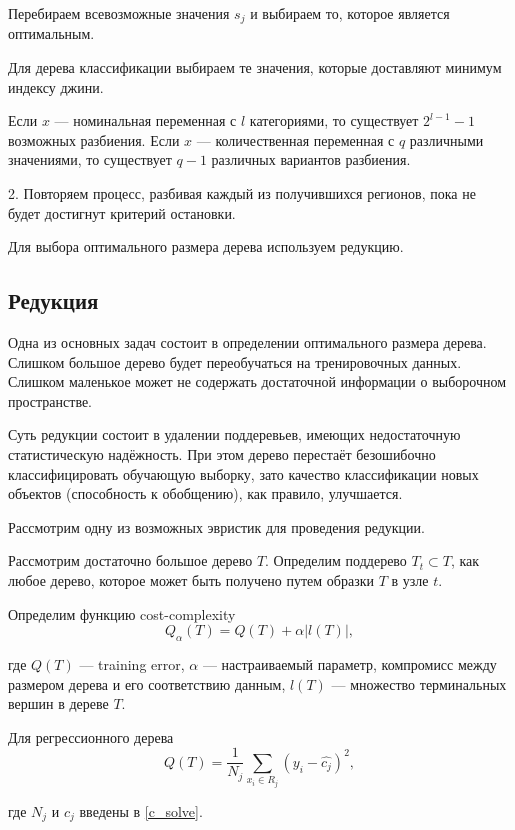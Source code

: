 \documentclass[14pt, a4paper]{article}
\begin{document}
Перебираем всевозможные значения $s_j$ и выбираем то, которое является оптимальным.

Для дерева классификации выбираем те значения, которые доставляют минимум индексу джини. 

Если $x$ --- номинальная переменная с $l$ категориями, то существует $2^{l-1} -1$ возможных разбиения. Если $x$ --- количественная переменная с $q$ различными значениями, то существует $q-1$ различных вариантов разбиения.

2. Повторяем процесс, разбивая каждый из получившихся регионов, пока не будет достигнут критерий остановки. 

Для выбора оптимального размера дерева используем редукцию.


\subsection{Редукция}
Одна из основных задач состоит в определении оптимального размера дерева. Слишком большое дерево будет переобучаться на тренировочных данных. Слишком маленькое может не содержать достаточной информации о выборочном пространстве.

Суть редукции состоит в удалении поддеревьев, имеющих недостаточную статистическую надёжность. При этом дерево перестаёт
безошибочно классифицировать обучающую выборку, зато качество классификации новых объектов (способность к обобщению), как правило, улучшается.

Рассмотрим одну из возможных эвристик для проведения редукции.

Рассмотрим достаточно большое дерево $T$. Определим поддерево $T_t \subset T$, как любое дерево, которое может быть получено путем образки $T$ в узле $t$.  

Определим функцию cost-complexity 
\begin{equation}
Q_{\alpha}(T) = Q(T) + \alpha |l(T)|,
\end{equation}

\noindent где $Q(T)$ --- training error, $\alpha$ --- настраиваемый параметр, компромисс между размером дерева и его соответствию данным, $l(T)$ --- множество терминальных вершин в дереве $T$.

Для регрессионного дерева
\begin{equation}
Q(T) = \frac{1}{N_j} \sum_{x_i \in R_j} (y_i - \hat{c_j})^2,
\end{equation}

\noindent где $N_j$ и $c_j$ введены в \eqref{c_solve}. 
\end{document}
